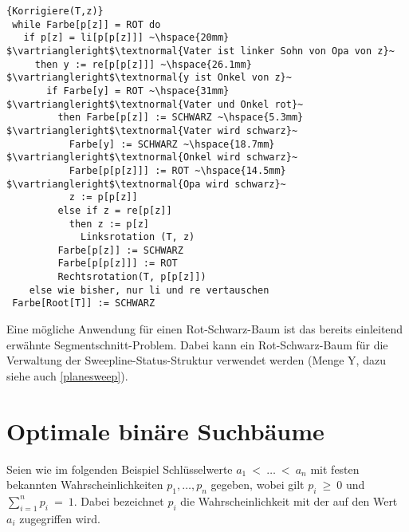 \begin{Algorithmus}[H]
\begin{lstlisting}[frame=tlrb, mathescape=true, title=\textsc{Korrigiere\textnormal{(T, z)}}, gobble=1]{Korrigiere(T,z)}
 while Farbe[p[z]] = ROT do
   if p[z] = li[p[p[z]]] ~\hspace{20mm}  $\vartriangleright$\textnormal{Vater ist linker Sohn von Opa von z}~
     then y := re[p[p[z]]] ~\hspace{26.1mm} $\vartriangleright$\textnormal{y ist Onkel von z}~
       if Farbe[y] = ROT ~\hspace{31mm} $\vartriangleright$\textnormal{Vater und Onkel rot}~
         then Farbe[p[z]] := SCHWARZ ~\hspace{5.3mm} $\vartriangleright$\textnormal{Vater wird schwarz}~
           Farbe[y] := SCHWARZ ~\hspace{18.7mm} $\vartriangleright$\textnormal{Onkel wird schwarz}~
           Farbe[p[p[z]]] := ROT ~\hspace{14.5mm} $\vartriangleright$\textnormal{Opa wird schwarz}~
           z := p[p[z]]
         else if z = re[p[z]]
           then z := p[z]
             Linksrotation (T, z)
         Farbe[p[z]] := SCHWARZ
         Farbe[p[p[z]]] := ROT
         Rechtsrotation(T, p[p[z]])
    else wie bisher, nur li und re vertauschen
 Farbe[Root[T]] := SCHWARZ
\end{lstlisting}
\end{Algorithmus}

Eine mögliche Anwendung für einen Rot-Schwarz-Baum ist das bereits einleitend erwähnte Segmentschnitt-Problem. Dabei kann ein
Rot-Schwarz-Baum für die Verwaltung der Sweepline-Status-Struktur verwendet werden (Menge Y, dazu siehe auch \autoref{planesweep}).

\section{Optimale binäre Suchbäume}

Seien wie im folgenden Beispiel Schlüsselwerte $a_1\:<\:\ldots\:<\:a_n$ mit festen bekannten Wahrscheinlichkeiten $p_1,\ldots,p_n$ gegeben, wobei gilt $p_i\:
\geq\:0$ und $\sum_{i=1}^n p_i\:=\:1$. Dabei bezeichnet $p_i$ die Wahrscheinlichkeit mit der auf den Wert $a_i$ zugegriffen wird.

